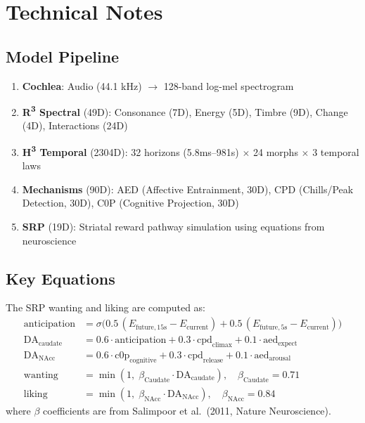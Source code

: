 \documentclass[11pt]{article}
\begin{document}
\section{Technical Notes}

\subsection{Model Pipeline}
\begin{enumerate}
    \item \textbf{Cochlea}: Audio (44.1 kHz) $\rightarrow$ 128-band log-mel spectrogram
    \item \textbf{R\textsuperscript{3} Spectral} (49D): Consonance (7D), Energy (5D), Timbre (9D), Change (4D), Interactions (24D)
    \item \textbf{H\textsuperscript{3} Temporal} (2304D): 32 horizons (5.8ms--981s) $\times$ 24 morphs $\times$ 3 temporal laws
    \item \textbf{Mechanisms} (90D): AED (Affective Entrainment, 30D), CPD (Chills/Peak Detection, 30D), C0P (Cognitive Projection, 30D)
    \item \textbf{SRP} (19D): Striatal reward pathway simulation using equations from neuroscience
\end{enumerate}

\subsection{Key Equations}
The SRP wanting and liking are computed as:
\begin{align}
    \text{anticipation} &= \sigma\!\Big(0.5\,(E_{\text{future},15\text{s}} - E_{\text{current}}) + 0.5\,(E_{\text{future},5\text{s}} - E_{\text{current}})\Big) \\
    \text{DA}_{\text{caudate}} &= 0.6 \cdot \text{anticipation} + 0.3 \cdot \text{cpd}_{\text{climax}} + 0.1 \cdot \text{aed}_{\text{expect}} \\
    \text{DA}_{\text{NAcc}} &= 0.6 \cdot \text{c0p}_{\text{cognitive}} + 0.3 \cdot \text{cpd}_{\text{release}} + 0.1 \cdot \text{aed}_{\text{arousal}} \\
    \text{wanting} &= \min(1,\; \beta_{\text{Caudate}} \cdot \text{DA}_{\text{caudate}}), \quad \beta_{\text{Caudate}} = 0.71 \\
    \text{liking} &= \min(1,\; \beta_{\text{NAcc}} \cdot \text{DA}_{\text{NAcc}}), \quad \beta_{\text{NAcc}} = 0.84
\end{align}
where $\beta$ coefficients are from Salimpoor et al.\ (2011, Nature Neuroscience).
\end{document}

